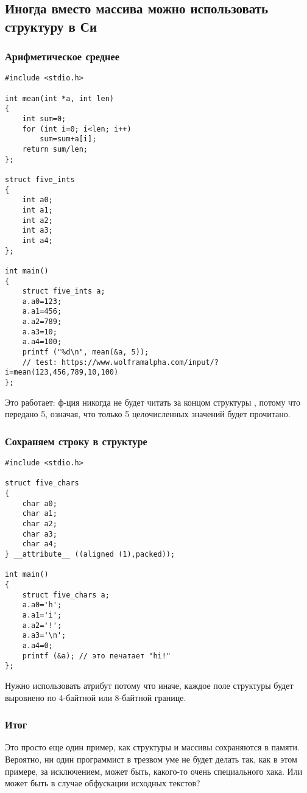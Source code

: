 \subsection{Иногда вместо массива можно использовать структуру в Си}

\subsubsection{Арифметическое среднее}

\begin{lstlisting}[style=customc]
#include <stdio.h>

int mean(int *a, int len)
{
	int sum=0;
	for (int i=0; i<len; i++)
		sum=sum+a[i];
	return sum/len;
};

struct five_ints
{
	int a0;
	int a1;
	int a2;
	int a3;
	int a4;
};

int main()
{
	struct five_ints a;
	a.a0=123;
	a.a1=456;
	a.a2=789;
	a.a3=10;
	a.a4=100;
	printf ("%d\n", mean(&a, 5));
	// test: https://www.wolframalpha.com/input/?i=mean(123,456,789,10,100)
};
\end{lstlisting}

Это работает: ф-ция  никогда не будет читать за концом структуры ,
потому что передано 5, означая, что только 5 целочисленных значений будет прочитано.

\subsubsection{Сохраняем строку в структуре}

\begin{lstlisting}[style=customc]
#include <stdio.h>

struct five_chars
{
	char a0;
	char a1;
	char a2;
	char a3;
	char a4;
} __attribute__ ((aligned (1),packed));

int main()
{
	struct five_chars a;
	a.a0='h';
	a.a1='i';
	a.a2='!';
	a.a3='\n';
	a.a4=0;
	printf (&a); // это печатает "hi!"
};
\end{lstlisting}

Нужно использовать атрибут  потому что иначе, каждое поле структуры будет выровнено по 4-байтной
или 8-байтной границе.

\subsubsection{Итог}

Это просто еще один пример, как структуры и массивы сохраняются в памяти.
Вероятно, ни один программист в трезвом уме не будет делать так, как в этом примере, за исключением, может быть, какого-то
очень специального хака.
Или может быть в случае обфускации исходных текстов?

